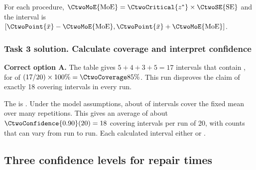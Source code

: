 For each procedure, $\CtwoMoE{\mathrm{MoE}}=\CtwoCritical{z^*}\times\CtwoSE{\mathrm{SE}}$ and the interval is $[\CtwoPoint{\bar{x}}-\CtwoMoE{\mathrm{MoE}},\CtwoPoint{\bar{x}}+\CtwoMoE{\mathrm{MoE}}]$.


\par\vspace{3mm}


\noindent\begin{minipage}{\linewidth}
\subsubsection*{Task 3 solution. Calculate coverage and interpret confidence}
\label{sol:c2-3-c}

\textbf{Correct option A.} The table gives $5+4+3+5=17$ intervals that contain , for  of $(17/20)\times100\%=\CtwoCoverage{85\%}$. This run disproves the claim of exactly 18 covering intervals in every run.

The  is . Under the model assumptions, about  of intervals cover the fixed mean over many repetitions. This gives an average of about $\CtwoConfidence{0.90}(20)=18$ covering intervals per run of 20, with counts that can vary from run to run. Each calculated interval either  or .

\par\vspace{3mm}
\end{minipage}\par

\clearpage

\subsection{Three confidence levels for repair times}
\label{prob:c2-compare-three}

